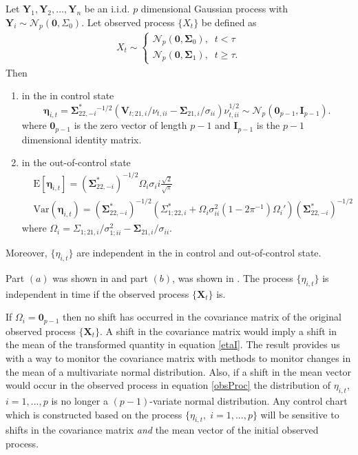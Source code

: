 \begin{theorem}
Let $\mathbf{Y}_1, \mathbf{Y}_2,...,\mathbf{Y}_n$ be an i.i.d. $p$ dimensional Gaussian process with $\mathbf{Y}_i\sim \mathcal{N}_p(\mathbf{0},\Sigma_0)$. Let observed process $\{X_t\}$ be defined as
\begin{align}
&X_t \sim
\begin{cases} 
\mathcal{N}_p(\mathbf{0},\boldsymbol{\Sigma}_0), \;\; t<\tau \\
\mathcal{N}_p(\mathbf{0},\boldsymbol{\Sigma}_1), \;\; t\geq \tau.
\end{cases}& \label{obsProc}
\end{align}
Then
\begin{enumerate}[label=(\alph*)]
\item in the in control state 
\begin{equation}\label{etaI}
\boldsymbol{\eta}_{i,t}= \boldsymbol{\Sigma}^*_{22,-i}^{-1/2}\left(\mathbf{V}_{t;21,i}/\nu_{t,ii}-\boldsymbol{\Sigma}_{21,i}/\sigma_{ii} \right)\nu_{t,ii}^{1/2} \sim \mathcal{N}_p(\mathbf{0}_{p-1},\mathbf{I}_{p-1}).
\end{equation}
where $\mathbf{0}_{p-1}$ is the zero vector of length $p-1$ and $\mathbf{I}_{p-1}$ is the $p-1$ dimensional identity matrix.
\item in the out-of-control state 
\begin{align}\label{expect}
& \text{E}[\boldsymbol{\eta}_{i,t}] = (\boldsymbol{\Sigma}^*_{22,-i})^{-1/2} \Omega_i \sigma_ii \frac{\sqrt{2}}{\sqrt{\pi}} & \\
& \text{Var}(\boldsymbol{\eta}_{i,t}) = (\boldsymbol{\Sigma}^*_{22,-i})^{-1/2} \left(\Sigma^*_{1;22,i}+\Omega_i\sigma^2_{ii}(1-2\pi^{-1})\Omega_i' \right)(\boldsymbol{\Sigma}^*_{22,-i})^{-1/2}&
\end{align}
where $\Omega_i = \Sigma_{1;21,i}/\sigma^2_{1;ii}-\boldsymbol{\Sigma}_{21,i}/\sigma_{ii}$.
\end{enumerate}
Moreover, $\{\eta_{i,t}\}$ are independent in the in control and out-of-control state.
\end{theorem}
Part $(a)$ was shown in \citet{Bodnar20082389} and part $(b)$, was shown in \citet{Bodnar2009}. The process $\{\eta_{i,t}\}$ is independent in time if the observed process $\{\mathbf{X}_{t}\}$ is. 

If $\Omega_i=\mathbf{0}_{p-1}$ then no shift has occurred in the covariance matrix of the original observed process $\{\mathbf{X}_{t}\}$. A shift in the covariance matrix would imply a shift in the mean of the transformed quantity in equation \eqref{etaI}. The result provides us with a way to monitor the covariance matrix with methods to monitor changes in the mean of a multivariate normal distribution. Also, if a shift in the mean vector would occur in the observed process in equation \eqref{obsProc} the distribution of $\eta_{i,t}$, $i=1,...,p$ is no longer a $(p-1)$-variate normal distribution. Any control chart which is constructed based on the process $\{\eta_{i,t},\; i=1,...,p\}$ will be sensitive to shifts in the covariance matrix \textit{and} the mean vector of the initial observed process.

